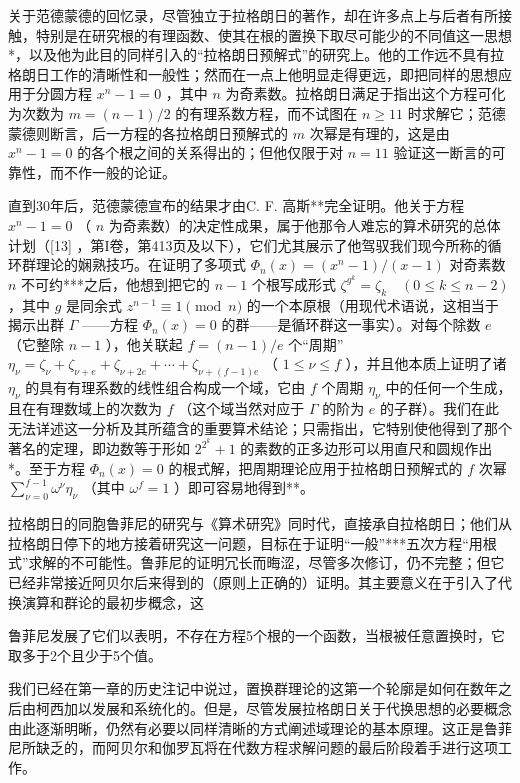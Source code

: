 关于范德蒙德的回忆录，尽管独立于拉格朗日的著作，却在许多点上与后者有所接触，特别是在研究根的有理函数、使其在根的置换下取尽可能少的不同值这一思想*，以及他为此目的同样引入的“拉格朗日预解式”的研究上。他的工作远不具有拉格朗日工作的清晰性和一般性；然而在一点上他明显走得更远，即把同样的思想应用于分圆方程 \(x^n - 1 = 0\) ，其中 \(n\) 为奇素数。拉格朗日满足于指出这个方程可化为次数为 \(m = (n - 1)/2\) 的有理系数方程，而不试图在 \(n \geqslant 11\) 时求解它；范德蒙德则断言，后一方程的各拉格朗日预解式的 \(m\) 次幂是有理的，这是由 \(x^n - 1 = 0\) 的各个根之间的关系得出的；但他仅限于对 \(n = 11\) 验证这一断言的可靠性，而不作一般的论证。

直到30年后，范德蒙德宣布的结果才由C. F. 高斯**完全证明。他关于方程 \(x^n - 1 = 0\) （ \(n\) 为奇素数）的决定性成果，属于他那令人难忘的算术研究的总体计划（{[}13{]} ，第I卷，第413页及以下），它们尤其展示了他驾驭我们现今所称的循环群理论的娴熟技巧。在证明了多项式 \(\Phi_n(x) = (x^n - 1)/(x - 1)\) 对奇素数 \(n\) 不可约***之后，他想到把它的 \(n - 1\) 个根写成形式 \(\zeta^{g^{k}} = \zeta_{k} \quad (0 \leqslant k \leqslant n - 2)\) ，其中 \(g\) 是同余式 \(z^{n-1} \equiv 1 \pmod{n}\) 的一个本原根（用现代术语说，这相当于揭示出群 \(\Gamma\) ——方程 \(\Phi_{n}(x) = 0\) 的群——是循环群这一事实）。对每个除数 \(e\) （它整除 \(n - 1\) ），他关联起 \(f = (n - 1)/e\) 个“周期” \(\eta_{\nu} = \zeta_{\nu} + \zeta_{\nu + e} + \zeta_{\nu + 2e} + \cdots + \zeta_{\nu + (f - 1)e}\) （ \(1 \leqslant \nu \leqslant f\) ），并且他本质上证明了诸 \(\eta_{\nu}\) 的具有有理系数的线性组合构成一个域，它由 \(f\) 个周期 \(\eta_{\nu}\) 中的任何一个生成，且在有理数域上的次数为 \(f\) （这个域当然对应于 \(\Gamma\) 的阶为 \(e\) 的子群）。我们在此无法详述这一分析及其所蕴含的重要算术结论；只需指出，它特别使他得到了那个著名的定理，即边数等于形如 \(2^{2^{k}} + 1\) 的素数的正多边形可以用直尺和圆规作出*。至于方程 \(\Phi_{n}(x) = 0\) 的根式解，把周期理论应用于拉格朗日预解式的 \(f\) 次幂 \(\sum_{\nu=0}^{f-1} \omega^{\nu} \eta_{\nu}\) （其中 \(\omega^{f} = 1\) ）即可容易地得到**。

拉格朗日的同胞鲁菲尼的研究与《算术研究》同时代，直接承自拉格朗日；他们从拉格朗日停下的地方接着研究这一问题，目标在于证明“一般”***五次方程“用根式”求解的不可能性。鲁菲尼的证明冗长而晦涩，尽管多次修订，仍不完整；但它已经非常接近阿贝尔后来得到的（原则上正确的）证明。其主要意义在于引入了代换演算和群论的最初步概念，这

鲁菲尼发展了它们以表明，不存在方程5个根的一个函数，当根被任意置换时，它取多于2个且少于5个值。

我们已经在第一章的历史注记中说过，置换群理论的这第一个轮廓是如何在数年之后由柯西加以发展和系统化的。但是，尽管发展拉格朗日关于代换思想的必要概念由此逐渐明晰，仍然有必要以同样清晰的方式阐述域理论的基本原理。这正是鲁菲尼所缺乏的，而阿贝尔和伽罗瓦将在代数方程求解问题的最后阶段着手进行这项工作。


